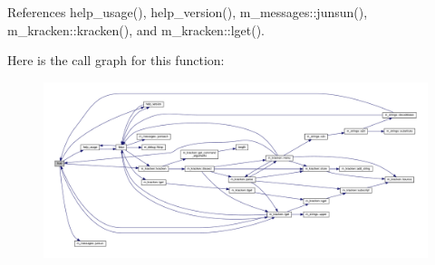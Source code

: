 References help\+\_\+usage(), help\+\_\+version(), m\+\_\+messages\+::junsun(), m\+\_\+kracken\+::kracken(), and m\+\_\+kracken\+::lget().

Here is the call graph for this function\+:
\nopagebreak
\begin{figure}[H]
\begin{center}
\leavevmode
\includegraphics[width=350pt]{__true_8f90_a7ed1d79677aed1b23489a4fe0bd16daa_cgraph}
\end{center}
\end{figure}
